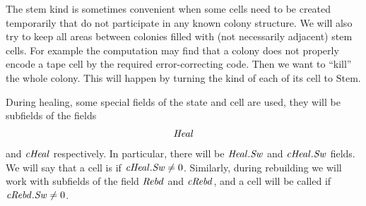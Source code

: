 \documentclass[12pt]{memoir}
\newcommand{\fld}[1]{\ensuremath{\textit{#1\/}}}
\newcommand{\Z}{Z}
\newcommand{\Addr}{\fld{Addr}}
\newcommand{\cAddr}{\fld{cAddr}}
\newcommand{\Core}{\fld{Core}}
\newcommand{\cCore}{\fld{cCore}}
\newcommand{\Drift}{\fld{Drift}}
\newcommand{\cDrift}{\fld{cDrift}}
\newcommand{\Kind}{\fld{Kind}}
\newcommand{\cKind}{\fld{cKind}}
\newcommand{\Heal}{\fld{Heal}}
\newcommand{\cHeal}{\fld{cHeal}}
\newcommand{\Rebd}{\fld{Rebd}}
\newcommand{\cRebd}{\fld{cRebd}}
\newcommand{\Sweep}{\fld{Sw}}
\newcommand{\cSweep}{\fld{cSw}}
\newcommand{\ZigDepth}{\fld{ZigDepth}}
\newcommand{\ZigDir}{\fld{ZigDir}}
\newcommand{\Stem}{\mathrm{Stem}}
\begin{document}
The stem kind is sometimes convenient when some cells need to be created temporarily
that do not participate in any known colony structure.
We will also try to keep all areas between colonies filled with (not necessarily adjacent)
stem cells.
For example the computation may find that a colony does not properly encode
a tape cell by the required error-correcting code.
Then we want to ``kill'' the whole colony.
This will happen by turning the kind of each of its cell to \( \Stem \).




During healing, some special fields of the state and cell are used, they will be subfields of 
the fields
 \begin{align}\label{eq:Heal}
   \Heal
 \end{align} 
and \( \cHeal \) respectively.
In particular, there will be \( \Heal.\Sweep \) and \( \cHeal.\Sweep \) fields.
We will say that a cell is  if \( \cHeal.\Sweep\ne 0 \).
Similarly, during rebuilding we will work with subfields of the field \( \Rebd \) and
\( \cRebd \), and a cell will be called  if \( \cRebd.\Sweep\ne 0 \).

\end{document}
